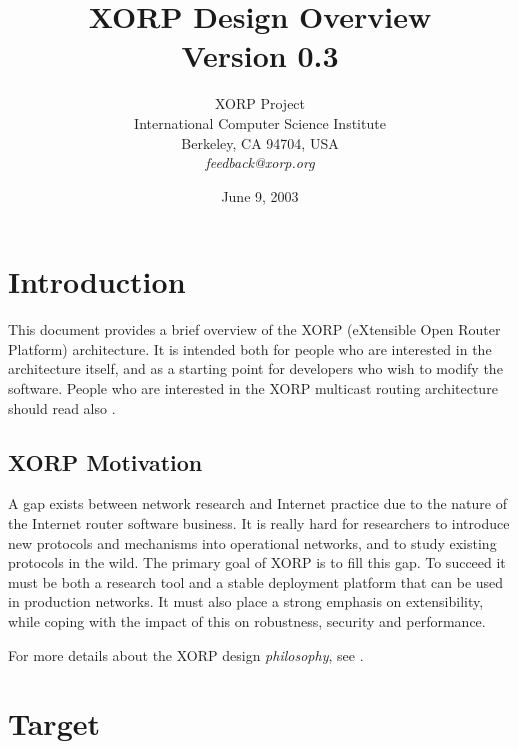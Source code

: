 \documentclass[11pt]{article}
\begin{document}
\title{XORP Design Overview \\
\vspace{1ex}
Version 0.3}
\author{ XORP Project					\\
	 International Computer Science Institute	\\
	 Berkeley, CA 94704, USA			\\
	 {\it feedback@xorp.org}
}
\date{June 9, 2003}

\maketitle

\thispagestyle{empty}


\section{Introduction}

This document provides a brief overview of the XORP (eXtensible Open
Router Platform) architecture. It is intended both for people who are
interested in the architecture itself, and as a starting point for developers
who wish to modify the software.  People who are interested in the XORP
multicast routing architecture should read also
\cite{xorp:multicast_arch}.

\subsection{XORP Motivation}

A gap exists between network research and Internet practice due to the
nature of the Internet router software business.  It is really hard
for researchers to introduce new protocols and mechanisms into
operational networks, and to study existing protocols in the wild.
The primary goal of XORP is to fill this gap.  To succeed it must be both
a research tool and a stable deployment platform that can be used in
production networks.  It must also place a strong emphasis on
extensibility, while coping with the impact of this on robustness,
security and performance.

For more details about the XORP design {\it philosophy}, see
\cite{handley:hotnets2002:xorp}.

\section{Target}
\end{document}
